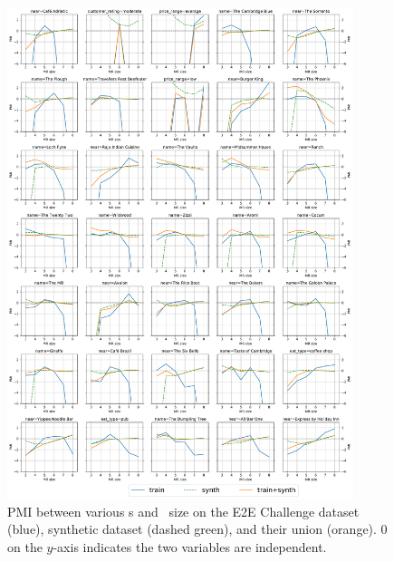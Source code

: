 
\begin{figure}[p]
\centering
    \includegraphics[width=0.9\textwidth]{ch5/figures/synthpmis.pdf}
\caption{PMI between various \attributevalue s and \meaningrepresentation~size
on the E2E Challenge dataset (blue), synthetic dataset (dashed green), and their union (orange). 0 on the $y$-axis indicates the two variables are independent.}
\label{fig:synthpmi}
\end{figure}
